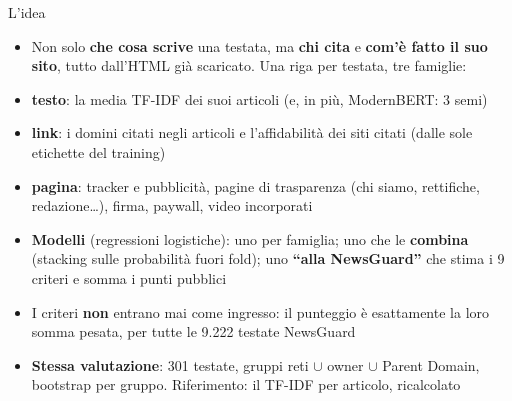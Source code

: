 \documentclass[aspectratio=169]{beamer}
\newcommand{\hl}[1]{\textbf{#1}}
\begin{document}
\begin{frame}{L'idea}
  \begin{itemize}
    \setlength\itemsep{0.55em}
    \small
    \item Non solo \hl{che cosa scrive} una testata, ma \hl{chi cita} e \hl{com'\`e fatto il suo sito}, tutto dall'HTML gi\`a scaricato. Una riga per testata, tre famiglie:
    \item[] \hl{testo}: la media TF-IDF dei suoi articoli (e, in pi\`u, ModernBERT: 3 semi)
    \item[] \hl{link}: i domini citati negli articoli e l'affidabilit\`a dei siti citati (dalle sole etichette del training)
    \item[] \hl{pagina}: tracker e pubblicit\`a, pagine di trasparenza (chi siamo, rettifiche, redazione\dots), firma, paywall, video incorporati
    \item \hl{Modelli} (regressioni logistiche): uno per famiglia; uno che le \hl{combina} (stacking sulle probabilit\`a fuori fold); uno \hl{``alla NewsGuard''} che stima i 9 criteri e somma i punti pubblici
    \item I criteri \hl{non} entrano mai come ingresso: il punteggio \`e esattamente la loro somma pesata, per tutte le 9.222 testate NewsGuard
    \item \hl{Stessa valutazione}: 301 testate, gruppi reti $\cup$ owner $\cup$ Parent Domain, bootstrap per gruppo. Riferimento: il TF-IDF per articolo, ricalcolato
  \end{itemize}
\end{frame}
\end{document}
